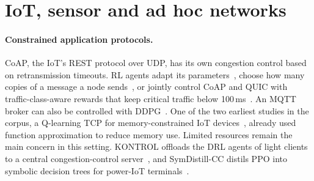 
\section{IoT, sensor and ad hoc networks}
\label{sec:iot}

\paragraph{Constrained application protocols.} CoAP, the IoT's REST protocol over UDP, has its own congestion control based on retransmission timeouts. RL agents adapt its parameters~\cite{jayaudhaya2023acoco,donta2023icocoa}, choose how many copies of a message a node sends~\cite{tariq2023ai}, or jointly control CoAP and QUIC with traffic-class-aware rewards that keep critical traffic below 100\,ms~\cite{choi2026energy}. An MQTT broker can also be controlled with DDPG~\cite{janani2026adaptive}. One of the two earliest studies in the corpus, a Q-learning TCP for memory-constrained IoT devices~\cite{li2016learning}, already used function approximation to reduce memory use. Limited resources remain the main concern in this setting. KONTROL offloads the DRL agents of light clients to a central congestion-control server~\cite{wang2025kontrol}, and SymDistill-CC distils PPO into symbolic decision trees for power-IoT terminals~\cite{lu2026wapi}.

